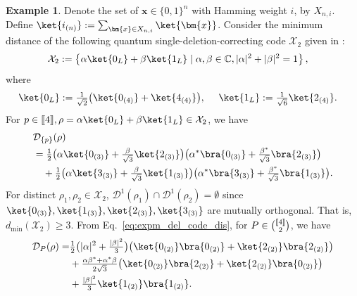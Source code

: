 \documentclass[reprint,amsmath,amssymb,aps,]{revtex4-2}
\theoremstyle{definition}
\newtheorem{exam}{Example}
\newcommand{\SET}[1]{\mathbb{#1}}
\newcommand{\C}{\SET{C}}
\newcommand{\1}{\mbox{1}\hspace{-0.25em}\mbox{l}}%
\newcommand{\setint}[1]{[\hspace{-0.5mm}[#1]\hspace{-0.5mm}]}
\newcommand{\subint}[2]{\tbinom{\setint{#1}}{#2}}
\newcommand{\QU}[1]{\mathcal{#1}}
\begin{document}
\begin{exam}
  \label{exam:dis=4}
  Denote the set of $\bm{x} \in \{ 0,1 \}^n$ with Hamming weight $i$,
  by $X_{n,i}$.
  Define $\ket{i_{(n)}} := \sum_{ \bm{x} \in X_{n,i} } \ket{\bm{x}}$.
  Consider
  the minimum distance of the following quantum single-deletion-correcting code
  $\QU{X}_2$ given in \cite{hagiwara2020four}:
  \begin{align*}
    &\QU{X}_2
    :=
    \left\{
    \alpha
    \ket{0_L}
    +
    \beta
    \ket{1_L}
    \mid
    \alpha,\beta \in \C, |\alpha|^2+|\beta|^2 = 1
    \right\},
  \end{align*}
  where
  \begin{align*}
    &\ket{0_L}
    :=
    \tfrac{ 1 }{ \sqrt{2} }\big( \ket{0_{(4)}} + \ket{4_{(4)}}\big),
    ~~~~
    \ket{1_L}
    :=
    \tfrac{ 1 }{ \sqrt{6} } \ket{2_{(4)}}.
  \end{align*}
  For $p \in \setint{4}, \rho = \alpha \ket{0_L} + \beta \ket{1_L} \in \QU{X}_2$,
  we have
  \begin{align}
    &\QU{D}_{\{p\}}(\rho)
    \nonumber\\
    &=
    \tfrac{1}{2}
    \big( \alpha\ket{0_{(3)}} + \tfrac{\beta}{\sqrt{3}}\ket{2_{(3)}} \big)
    \big( \alpha^*\bra{0_{(3)}} + \tfrac{\beta^*}{\sqrt{3}}\bra{2_{(3)}} \big)
    \nonumber\\
    &~~~+
    \tfrac{1}{2}
    \big( \alpha\ket{3_{(3)}}+\tfrac{\beta}{\sqrt{3}}\ket{1_{(3)}} \big)
    \big( \alpha^*\bra{3_{(3)}}+\tfrac{\beta^*}{\sqrt{3}}\bra{1_{(3)}} \big).
    \label{eq:expm_del_code_dis}
  \end{align}
  For distinct $\rho_1, \rho_2 \in \QU{X}_2$,
  $\QU{D}^1(\rho_1) \cap \QU{D}^1(\rho_2) = \emptyset$
  since
  $\ket{0_{(3)}}, \ket{1_{(3)}}, \ket{2_{(3)}}, \ket{3_{(3)}}$
  are
  mutually orthogonal.
  That is,
  $d_{\text{min}}(\QU{X}_2) \ge 3$.
  From Eq.~\eqref{eq:expm_del_code_dis},
  for $P \in \subint{4}{2}$,
  we have
  \begin{align}
    \QU{D}_P(\rho)
    =&
    \tfrac{1}{2}
    \big(
    |\alpha|^2 + \tfrac{|\beta|^2}{3}
    \big)
    \big(
    \ket{0_{(2)}}\bra{0_{(2)}} + \ket{2_{(2)}}\bra{2_{(2)}}
    \big)
    \nonumber\\
    &+
    \tfrac{ \alpha\beta^* + \alpha^*\beta }{2\sqrt{3}}
    \big(
    \ket{0_{(2)}}\bra{2_{(2)}} + \ket{2_{(2)}}\bra{0_{(2)}}
    \big)
    \nonumber\\
    &+
    \tfrac{|\beta|^2}{3}\ket{1_{(2)}}\bra{1_{(2)}}.
    \label{eq:expm_del_code_dis_4}
  \end{align}

\end{exam}
\end{document}
